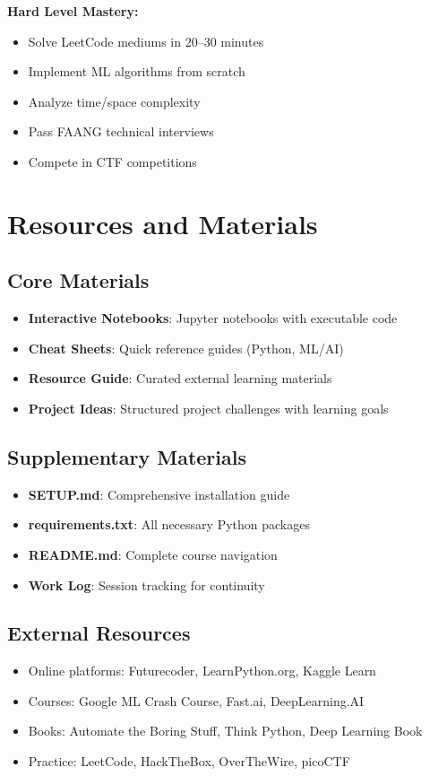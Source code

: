 \documentclass[11pt,letterpaper]{article}
\begin{document}
\textbf{Hard Level Mastery:}
\begin{itemize}[leftmargin=*]
    \item Solve LeetCode mediums in 20--30 minutes
    \item Implement ML algorithms from scratch
    \item Analyze time/space complexity
    \item Pass FAANG technical interviews
    \item Compete in CTF competitions
\end{itemize}

\section{Resources and Materials}

\subsection{Core Materials}
\begin{itemize}[leftmargin=*]
    \item \textbf{Interactive Notebooks}: Jupyter notebooks with executable code
    \item \textbf{Cheat Sheets}: Quick reference guides (Python, ML/AI)
    \item \textbf{Resource Guide}: Curated external learning materials
    \item \textbf{Project Ideas}: Structured project challenges with learning goals
\end{itemize}

\subsection{Supplementary Materials}
\begin{itemize}[leftmargin=*]
    \item \textbf{SETUP.md}: Comprehensive installation guide
    \item \textbf{requirements.txt}: All necessary Python packages
    \item \textbf{README.md}: Complete course navigation
    \item \textbf{Work Log}: Session tracking for continuity
\end{itemize}

\subsection{External Resources}
\begin{itemize}[leftmargin=*]
    \item Online platforms: Futurecoder, LearnPython.org, Kaggle Learn
    \item Courses: Google ML Crash Course, Fast.ai, DeepLearning.AI
    \item Books: Automate the Boring Stuff, Think Python, Deep Learning Book
    \item Practice: LeetCode, HackTheBox, OverTheWire, picoCTF
\end{itemize}
\end{document}
